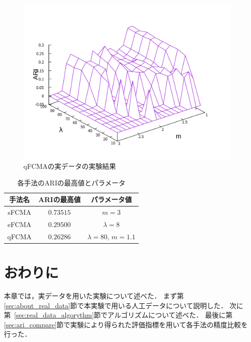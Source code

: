 \documentclass[a4j,12pt,dvipdfmx,oneside]{jsbook}
\theoremstyle{definition}
\begin{document}
\begin{figure}[h]
\begin{minipage}{0.43\hsize}
    \includegraphics[width=\linewidth]{qFCMA_ARI.pdf}
    \caption{qFCMAの実データの実験結果}
    \label{fig:qFCMA_ARI}
   \end{minipage}
  \end{figure}

  \begin{table}[h]
   \centering
   \caption{各手法のARIの最高値とパラメータ}
   \begin{center}
    \begin{tabular}{ c || c | c }\hline
     手法名 & ARIの最高値 & パラメータ値\\ \hline \hline
     sFCMA & $0.73515$ & $m = 3$\\ \hline
     eFCMA & $0.29500$& $\lambda = 8$\\ \hline  
     qFCMA & $0.26286$ & $\lambda = 80$, $m = 1.1$\\  \hline
    \end{tabular}
    \label{tbl:max_ari}
   \end{center}
  \end{table}


  \section{おわりに}\label{sec:real_data_summary}
  本章では，実データを用いた実験について述べた．
  まず第\ref{sec:about_real_data}節で本実験で用いる人工データについて説明した．
  次に第~\ref{sec:real_data_algorythm}節でアルゴリズムについて述べた．
  最後に第\ref{sec:ari_compare}節で実験により得られた評価指標を用いて各手法の精度比較を行った．
  
\end{document}
